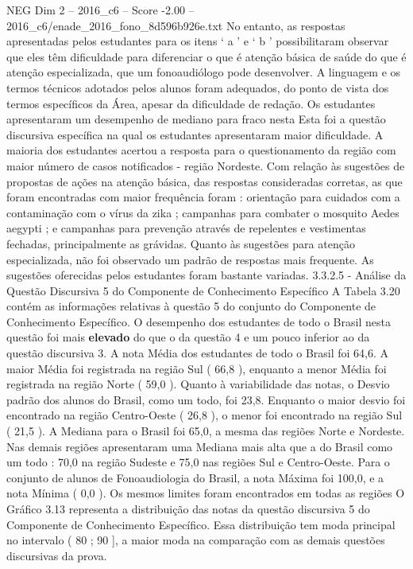 \begin{textsample}{NEG Dim 2 – 2016\_c6 – Score -2.00 – 2016\_c6/enade\_2016\_fono\_8d596b926e.txt}
No entanto, as respostas apresentadas pelos estudantes para os itens ‘ a ’ e ‘ b ’ possibilitaram observar que eles têm dificuldade para diferenciar o que é atenção básica de saúde do que é atenção especializada, que um fonoaudiólogo pode desenvolver.
A linguagem e os termos técnicos adotados pelos alunos foram adequados, do ponto de vista dos termos específicos da Área, apesar da dificuldade de redação.
Os estudantes apresentaram um desempenho de mediano para fraco nesta Esta foi a questão discursiva específica na qual os estudantes apresentaram maior dificuldade.
A maioria dos estudantes acertou a resposta para o questionamento da região com maior número de casos notificados - região Nordeste.
Com relação às sugestões de propostas de ações na atenção básica, das respostas consideradas corretas, as que foram encontradas com maior frequência foram : orientação para cuidados com a contaminação com o vírus da zika ; campanhas para combater o mosquito Aedes aegypti ; e campanhas para prevenção através de repelentes e vestimentas fechadas, principalmente as grávidas.
Quanto às sugestões para atenção especializada, não foi observado um padrão de respostas mais frequente.
As sugestões oferecidas pelos estudantes foram bastante variadas. 3.3.2.5 - Análise da Questão Discursiva 5 do Componente de Conhecimento Específico A Tabela 3.20 contém as informações relativas à questão 5 do conjunto do Componente de Conhecimento Específico.
O desempenho dos estudantes de todo o Brasil nesta questão foi mais \textbf{elevado} do que o da questão 4 e um pouco inferior ao da questão discursiva 3.
A nota Média dos estudantes de todo o Brasil foi 64,6.
A maior Média foi registrada na região Sul ( 66,8 ), enquanto a menor Média foi registrada na região Norte ( 59,0 ).
Quanto à variabilidade das notas, o Desvio padrão dos alunos do Brasil, como um todo, foi 23,8.
Enquanto o maior desvio foi encontrado na região Centro-Oeste ( 26,8 ), o menor foi encontrado na região Sul ( 21,5 ).
A Mediana para o Brasil foi 65,0, a mesma das regiões Norte e Nordeste.
Nas demais regiões apresentaram uma Mediana mais alta que a do Brasil como um todo : 70,0 na região Sudeste e 75,0 nas regiões Sul e Centro-Oeste.
Para o conjunto de alunos de Fonoaudiologia do Brasil, a nota Máxima foi 100,0, e a nota Mínima ( 0,0 ).
Os mesmos limites foram encontrados em todas as regiões O Gráfico 3.13 representa a distribuição das notas da questão discursiva 5 do Componente de Conhecimento Específico.
Essa distribuição tem moda principal no intervalo ( 80 ; 90 ], a maior moda na comparação com as demais questões discursivas da prova.

\end{textsample}

